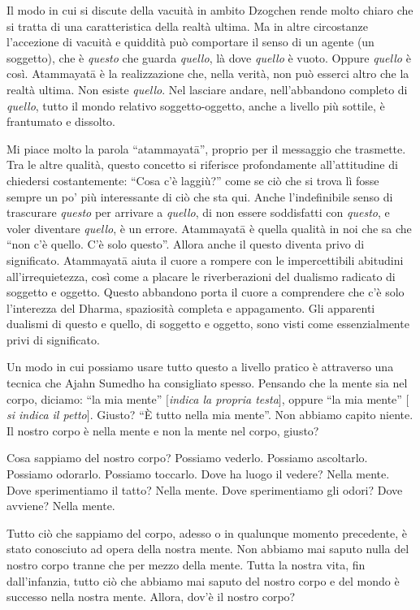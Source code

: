 Il modo in cui si discute della vacuità in ambito Dzogchen rende molto chiaro che si tratta di una caratteristica della realtà ultima. Ma in altre circostanze l'accezione di vacuità e quiddità può comportare il senso di un agente (un soggetto), che è \textit{questo} che guarda \textit{quello}, là dove \textit{quello} è vuoto. Oppure \textit{quello} è così. Atammayatā è la realizzazione che, nella verità, non può esserci altro che la realtà ultima. Non esiste \textit{quello}. Nel lasciare andare, nell'abbandono completo di \textit{quello}, tutto il mondo relativo soggetto-oggetto, anche a livello più sottile, è frantumato e dissolto.

Mi piace molto la parola ``atammayatā'', proprio per il messaggio che trasmette. Tra le altre qualità, questo concetto si riferisce profondamente all'attitudine di chiedersi costantemente: ``Cosa c'è laggiù?'' come se ciò che si trova lì fosse sempre un po' più interessante di ciò che sta qui. Anche l'indefinibile senso di trascurare \textit{questo} per arrivare a \textit{quello}, di non essere soddisfatti con \textit{questo}, e voler diventare \textit{quello}, è un errore. Atammayatā è quella qualità in noi che sa che ``non c'è quello. C'è solo questo''. Allora anche il questo diventa privo di significato. Atammayatā aiuta il cuore a rompere con le impercettibili abitudini all'irrequietezza, così come a placare le riverberazioni del dualismo radicato di soggetto e oggetto. Questo abbandono porta il cuore a comprendere che c'è solo l'interezza del Dharma, spaziosità completa e appagamento. Gli apparenti dualismi di questo e quello, di soggetto e oggetto, sono visti come essenzialmente privi di significato. 

Un modo in cui possiamo usare tutto questo a livello pratico è attraverso una tecnica che Ajahn Sumedho ha consigliato spesso. Pensando che la mente sia nel corpo, diciamo: ``la mia mente'' $[$\textit{indica la propria testa$]$}, oppure ``la mia mente'' $[$\textit{si indica il petto$]$}. Giusto? ``È tutto nella mia mente''. Non abbiamo capito niente. Il nostro corpo è nella mente e non la mente nel corpo, giusto?

Cosa sappiamo del nostro corpo? Possiamo vederlo. Possiamo ascoltarlo. Possiamo odorarlo. Possiamo toccarlo. Dove ha luogo il vedere? Nella mente. Dove sperimentiamo il tatto? Nella mente. Dove sperimentiamo gli odori? Dove avviene? Nella mente.

Tutto ciò che sappiamo del corpo, adesso o in qualunque momento precedente, è stato conosciuto ad opera della nostra mente. Non abbiamo mai saputo nulla del nostro corpo tranne che per mezzo della mente. Tutta la nostra vita, fin dall'infanzia, tutto ciò che abbiamo mai saputo del nostro corpo e del mondo è successo nella nostra mente. Allora, dov'è il nostro corpo?


